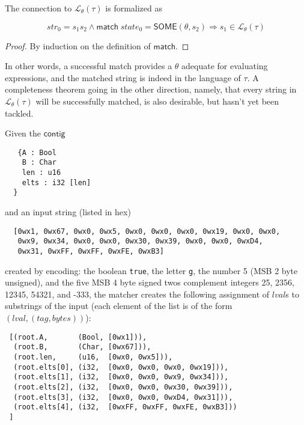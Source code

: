 \documentclass[a4paper,UKenglish,cleveref, autoref, thm-restate]{lipics-v2021}
\newcommand{\konst}[1]{\ensuremath{\mathsf{#1}}}
\newcommand{\imp}{\Rightarrow}
\newcommand{\LangTheta}[1]{\ensuremath{{\mathcal L}_{\theta}({#1})}}
\begin{document}
\begin{theorem}

The connection to $\LangTheta{\tau}$ is formalized as

\[
  \mathit{str}_0 = s_1 s_2 \land \konst{match}\; \mathit{state}_0 =
  \konst{SOME}(\theta, s_2) \imp s_1 \in \LangTheta{\tau}
\]

\begin{proof}
By induction on the definition of \konst{match}.
\end{proof}
\end{theorem}

In other words, a successful match provides a $\theta$ adequate for
evaluating expressions, and the matched string is indeed in the
language of $\tau$. A completeness theorem going in the other
direction, namely, that every string in $\LangTheta{\tau}$ will be
successfully matched, is also desirable, but hasn't yet been tackled.


\begin{example}
Given the \konst{contig}
\begin{verbatim}
   {A : Bool
    B : Char
    len : u16
    elts : i32 [len]
  }
\end{verbatim}
\noindent and an input string (listed in hex)
\begin{verbatim}
  [0wx1, 0wx67, 0wx0, 0wx5, 0wx0, 0wx0, 0wx0, 0wx19, 0wx0, 0wx0,
   0wx9, 0wx34, 0wx0, 0wx0, 0wx30, 0wx39, 0wx0, 0wx0, 0wxD4,
   0wx31, 0wxFF, 0wxFF, 0wxFE, 0wxB3]
\end{verbatim}
created by encoding: the boolean \verb+true+, the letter \verb+g+, the
number 5 (MSB 2 byte unsigned), and the five MSB 4 byte signed twos complement
integers 25, 2356, 12345, 54321, and -333, the matcher creates the
following assignment of $\mathit{lval}$s to substrings of the input
(each element of the list is of the form
$(\mathit{lval}, (\mathit{tag},\mathit{bytes}))$):

\begin{verbatim}
 [(root.A,       (Bool, [0wx1])),
  (root.B,       (Char, [0wx67])),
  (root.len,     (u16,  [0wx0, 0wx5])),
  (root.elts[0], (i32,  [0wx0, 0wx0, 0wx0, 0wx19])),
  (root.elts[1], (i32,  [0wx0, 0wx0, 0wx9, 0wx34])),
  (root.elts[2], (i32,  [0wx0, 0wx0, 0wx30, 0wx39])),
  (root.elts[3], (i32,  [0wx0, 0wx0, 0wxD4, 0wx31])),
  (root.elts[4], (i32,  [0wxFF, 0wxFF, 0wxFE, 0wxB3]))
 ]
\end{verbatim}

\end{example}
\end{document}
